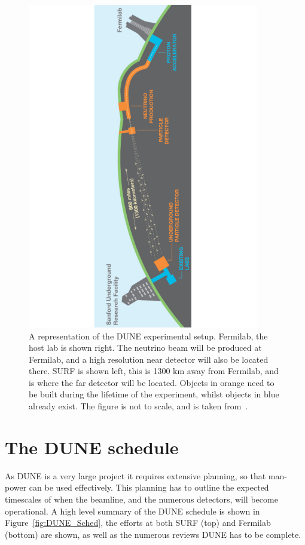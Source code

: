 \begin{figure}
  \centering
  \includegraphics[width=0.9\textwidth]{DUNESchematic}
  \caption[A representation of the DUNE experimental setup]
          {A representation of the DUNE experimental setup. Fermilab, the host lab is shown right. The neutrino beam will be produced at Fermilab, and a high resolution near detector will also be located there. SURF is shown left, this is 1300 km away from Fermilab, and is where the far detector will be located. Objects in orange need to be built during the lifetime of the experiment, whilst objects in blue already exist. The figure is not to scale, and is taken from~\citep{DUNECDR_V1}.}
  \label{fig:DUNESchematic}
\end{figure}

\section{The DUNE schedule} \label{sec:DUNESched} %
As DUNE is a very large project it requires extensive planning, so that man-power can be used effectively. This planning has to outline the expected timescales of when the beamline, and the numerous detectors, will become operational. A high level summary of the DUNE schedule is shown in Figure~\ref{fig:DUNE_Sched}, the efforts at both SURF (top) and Fermilab (bottom) are shown, as well as the numerous reviews DUNE has to be complete. \\ 

